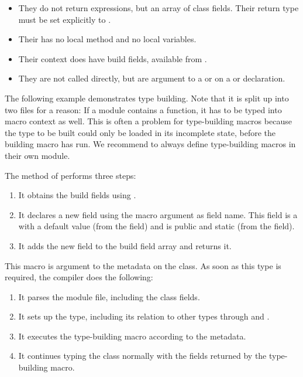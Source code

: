 \documentclass{haxe}
\begin{document}
\begin{itemize}
	\item They do not return expressions, but an array of class fields. Their return type must be set explicitly to .
	\item Their  has no local method and no local variables.
	\item Their context does have build fields, available from .
	\item They are not called directly, but are argument to a  or   on a  or  declaration.
\end{itemize}

The following example demonstrates type building. Note that it is split up into two files for a reason: If a module contains a  function, it has to be typed into macro context as well. This is often a problem for type-building macros because the type to be built could only be loaded in its incomplete state, before the building macro has run. We recommend to always define type-building macros in their own module.


The  method of  performs three steps:

\begin{enumerate}
	\item It obtains the build fields using .
	\item It declares a new  field using the  macro argument as field name. This field is a   with a default value  (from the  field) and is public and static (from the  field).
	\item It adds the new field to the build field array and returns it.
\end{enumerate}

This macro is argument to the  metadata on the  class. As soon as this type is required, the compiler does the following:

\begin{enumerate}
	\item It parses the module file, including the class fields.
	\item It sets up the type, including its relation to other types through  and .
	\item It executes the type-building macro according to the  metadata.
	\item It continues typing the class normally with the fields returned by the type-building macro.
\end{enumerate}
\end{document}
